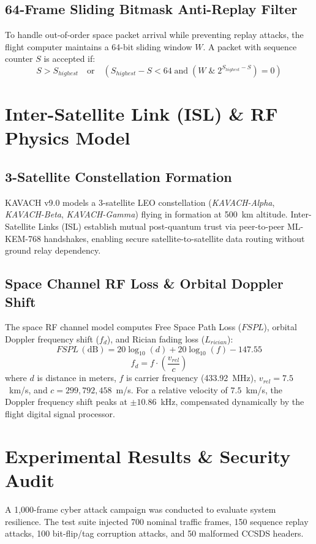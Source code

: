 \documentclass[conference]{IEEEtran}
\begin{document}
\subsection{64-Frame Sliding Bitmask Anti-Replay Filter}
To handle out-of-order space packet arrival while preventing replay attacks, the flight computer maintains a 64-bit sliding window $W$. A packet with sequence counter $S$ is accepted if:
\begin{equation}
S > S_{highest} \quad \text{or} \quad (S_{highest} - S < 64 \;\text{and}\; (W \;\&\; 2^{S_{highest}-S}) = 0)
\end{equation}

\section{Inter-Satellite Link (ISL) \& RF Physics Model}

\subsection{3-Satellite Constellation Formation}
KAVACH v9.0 models a 3-satellite LEO constellation (\textit{KAVACH-Alpha}, \textit{KAVACH-Beta}, \textit{KAVACH-Gamma}) flying in formation at 500~km altitude. Inter-Satellite Links (ISL) establish mutual post-quantum trust via peer-to-peer ML-KEM-768 handshakes, enabling secure satellite-to-satellite data routing without ground relay dependency.

\subsection{Space Channel RF Loss \& Orbital Doppler Shift}
The space RF channel model computes Free Space Path Loss ($FSPL$), orbital Doppler frequency shift ($f_d$), and Rician fading loss ($L_{rician}$):
\begin{equation}
FSPL \, (\text{dB}) = 20\log_{10}(d) + 20\log_{10}(f) - 147.55
\end{equation}
\begin{equation}
f_d = f \cdot \left(\frac{v_{rel}}{c}\right)
\end{equation}
where $d$ is distance in meters, $f$ is carrier frequency (433.92~MHz), $v_{rel} = 7.5$~km/s, and $c = 299,792,458$~m/s. For a relative velocity of $7.5$~km/s, the Doppler frequency shift peaks at $\pm 10.86$~kHz, compensated dynamically by the flight digital signal processor.

\section{Experimental Results \& Security Audit}
A 1,000-frame cyber attack campaign was conducted to evaluate system resilience. The test suite injected 700 nominal traffic frames, 150 sequence replay attacks, 100 bit-flip/tag corruption attacks, and 50 malformed CCSDS headers.
\end{document}
